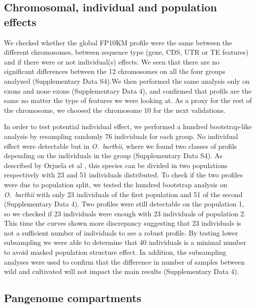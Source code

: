 \documentclass[10pt,letterpaper]{article}
\begin{document}
\subsection*{Chromosomal, individual and population effects}
We checked whether the global FP10KM profile were the same between the different chromosomes, between sequence type (gene, CDS, UTR or TE features) and if there were or not individual(s) effects. We seen that there are no significant differences between the 12 chromosomes on all the four groups analyzed (Supplementary Data S4).We then performed the same analysis only on exons and none exons  (Supplementary Data 4), and confirmed that profils are the same no matter the type of features we were looking at. As a proxy for the rest of the chromosome, we choosed the chromosome 10 for the next validations.

In order to test potential individual effect, we performed a hundred bootstrap-like analysis by resampling randomly 76 individuals for each group. No individual effect were detectable but in \textit{O.~barthii}, where we found two classes of profils depending on the individuals in the group (Supplementary Data S4). As described by Orjuela et al \cite{Orjuela2014}, this species can be divided in two populations respectively with 23 and 51 individuals distributed.
To check if the two profiles were due to population split, we tested the hundred bootstrap analysis on \textit{O.~barthii} with only 23 individuals of the first population and 51 of the second (Supplementary Data 4).
Two profiles were still detectable on the population 1, so we checked if 23 individuals were enough with 23 individuals of population 2. This time the curves shown more discrepancy suggesting that 23 individuals is not a sufficient number of individuals to see a robust profile. By testing lower subsampling we were able to determine that 40 individuals is a minimal number to avoid masked population structure effect.
In addition, the subsampling analyses were used to confirm that the difference in number of samples between wild and cultivated will not impact the main results (Supplementary Data 4).


\subsection*{Pangenome compartments}
\end{document}
